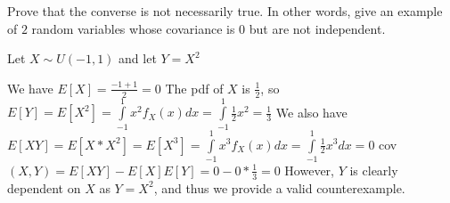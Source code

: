 \question Prove that the converse is not necessarily true. In other words, give an example of $2$ random variables whose covariance is $0$ but are not independent.
\begin{solution}[2cm]
	Let $X \mathtt{\sim} U(-1, 1)$ and let $Y = X^2$ \newline
	
	We have $E[X] = \frac{-1+1}{2} = 0$ \newline
	The pdf of $X$ is $\frac{1}{2}$, so \newline 
	$E[Y] = E[X^2] = \int\limits_{-1}^{1}x^2f_X(x) dx = \int\limits_{-1}^{1}\frac{1}{2}x^2 = \frac{1}{3}$ \newline
	We also have $E[XY] = E[X * X^2] = E[X^3] = \int\limits_{-1}^{1}x^3f_X(x) dx
	=  \int\limits_{-1}^{1}\frac{1}{2}x^3 dx  = 0$ \newline
	cov$(X, Y) = E[XY] - E[X]E[Y] = 0 - 0 * \frac{1}{3} = 0$ \newline
	However, $Y$ is clearly dependent on $X$ as $Y = X^2$, and thus we provide a valid counterexample. 
\end{solution}